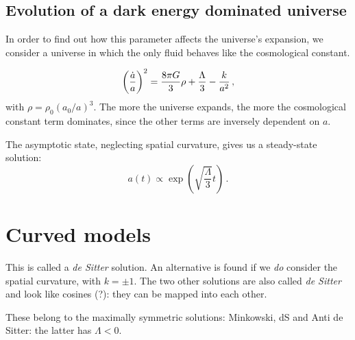 \documentclass[main.tex]{subfiles}
\begin{document}

\subsection{Evolution of a dark energy dominated universe}

In order to find out how this parameter affects the universe's expansion, we consider a universe in which the only fluid behaves like the cosmological constant. 

%
\begin{equation}
  \qty(\frac{\dot{a} }{a})^2 = \frac{8 \pi G }{3} \rho +\frac{\Lambda}{3} - \frac{k}{a^2}
\,,
\end{equation}
%
with \(\rho = \rho_0 (a_0 / a)^3\). The more the universe expands, the more the cosmological constant term dominates, since the other terms are inversely dependent on \(a\).

The asymptotic state, neglecting spatial curvature, gives us a steady-state solution: 
%
\begin{equation}
  a(t) \propto \exp(\sqrt{\frac{\Lambda}{3}} t) 
\,.
\end{equation}

\section{Curved models}

This is called a \emph{de Sitter} solution. An alternative is found if we \emph{do} consider the spatial curvature, with \(k = \pm 1\). The two other solutions are also called \emph{de Sitter} and look like cosines (?): they can be mapped into each other.


These belong to the maximally symmetric solutions: Minkowski, dS and Anti de Sitter: the latter has \(\Lambda < 0\).

\end{document}
